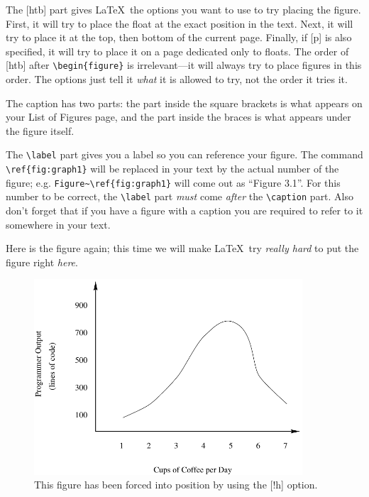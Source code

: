The [htb] part gives \LaTeX\ the options you want to use to try placing
the figure.  First, it will try to place the float at the exact
position in the text.  Next, it will try to place it at the top, then
bottom of the current page.  Finally, if [p] is also specified, 
it will try to place it on a page dedicated only to floats.  The order
of [htb] after \verb|\begin{figure}| is irrelevant---it will always
try to place figures in this order.  The options just tell it
{\em what} it is allowed to try, not the order it tries it.

The caption has two parts: the part inside the square brackets  is
what appears on your List of Figures page, and the part inside the
braces is what appears under the figure itself.

The \verb|\label| part  gives you a label so you can reference your
figure. The command \verb|\ref{fig:graph1}| will be replaced in your
text by the actual number of the figure;
e.g. \verb|Figure~\ref{fig:graph1}| will come out as ``Figure 3.1''.
For this number to be correct, the \verb|\label| part {\em must} come
{\em after} the \verb|\caption| part.  Also don't forget that if you
have a figure with a caption you are required to refer to it somewhere
in your text.

Here is the figure again;
this time we will make \LaTeX\ try {\em really hard} to put the figure
right {\em here}.

\begin{figure}[!h]
\begin{center}
\includegraphics[width = 100mm]{graph1.pdf}
\caption[Another example of a floating figure.]{This figure has been
forced into position by using the [!h] option.}
\label{fig:graph2}
\end{center}
\end{figure}

